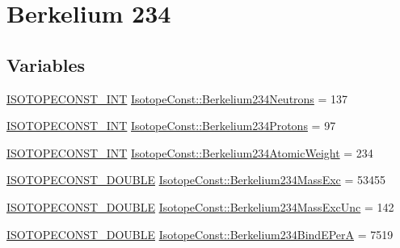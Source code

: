 \hypertarget{group___isotope_const-_berkelium-_bk234}{}\section{Berkelium 234}
\label{group___isotope_const-_berkelium-_bk234}
\subsection*{Variables}
\begin{DoxyCompactItemize}
\item 
\mbox{\hyperlink{group___isotope_const-_macros_ga5f18360b3e99483a35c32d789e62621c}{I\+S\+O\+T\+O\+P\+E\+C\+O\+N\+S\+T\+\_\+\+I\+NT}} \mbox{\hyperlink{group___isotope_const-_berkelium-_bk234_ga7feffbb15472103aad5c513143ddaabe}{Isotope\+Const\+::\+Berkelium234\+Neutrons}} = 137
\item 
\mbox{\hyperlink{group___isotope_const-_macros_ga5f18360b3e99483a35c32d789e62621c}{I\+S\+O\+T\+O\+P\+E\+C\+O\+N\+S\+T\+\_\+\+I\+NT}} \mbox{\hyperlink{group___isotope_const-_berkelium-_bk234_ga08d8082d06dda59ae171fff652c99bbf}{Isotope\+Const\+::\+Berkelium234\+Protons}} = 97
\item 
\mbox{\hyperlink{group___isotope_const-_macros_ga5f18360b3e99483a35c32d789e62621c}{I\+S\+O\+T\+O\+P\+E\+C\+O\+N\+S\+T\+\_\+\+I\+NT}} \mbox{\hyperlink{group___isotope_const-_berkelium-_bk234_ga4f4220653118d5240bea77af77573127}{Isotope\+Const\+::\+Berkelium234\+Atomic\+Weight}} = 234
\item 
\mbox{\hyperlink{group___isotope_const-_macros_ga8f45a7272ce02c0b4c65c44636ed719a}{I\+S\+O\+T\+O\+P\+E\+C\+O\+N\+S\+T\+\_\+\+D\+O\+U\+B\+LE}} \mbox{\hyperlink{group___isotope_const-_berkelium-_bk234_gaade22619d96c725dd97511971a95dba2}{Isotope\+Const\+::\+Berkelium234\+Mass\+Exc}} = 53455
\item 
\mbox{\hyperlink{group___isotope_const-_macros_ga8f45a7272ce02c0b4c65c44636ed719a}{I\+S\+O\+T\+O\+P\+E\+C\+O\+N\+S\+T\+\_\+\+D\+O\+U\+B\+LE}} \mbox{\hyperlink{group___isotope_const-_berkelium-_bk234_ga15fc67ff28b35be6c064cbc74b64a3d3}{Isotope\+Const\+::\+Berkelium234\+Mass\+Exc\+Unc}} = 142
\item 
\mbox{\hyperlink{group___isotope_const-_macros_ga8f45a7272ce02c0b4c65c44636ed719a}{I\+S\+O\+T\+O\+P\+E\+C\+O\+N\+S\+T\+\_\+\+D\+O\+U\+B\+LE}} \mbox{\hyperlink{group___isotope_const-_berkelium-_bk234_ga696e8d82c472d096ee9407093dbb076d}{Isotope\+Const\+::\+Berkelium234\+Bind\+E\+PerA}} = 7519
\item 

\end{DoxyCompactItemize}
